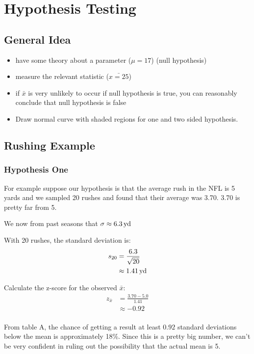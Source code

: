 \documentclass[letterpaper, landscape]{exam}
\begin{document}
  \section{Hypothesis Testing}

  \subsection{General Idea}
  \begin{itemize}
    \item have some theory about a parameter ($\mu = 17$) (null hypothesis)
    \item measure the relevant statistic ($\bar{x = 25}$)
    \item if $\bar{x}$ is very unlikely to occur if null hypothesis is true, you
      can reasonably conclude that null hypothesis is false
    \item Draw normal curve with shaded regions for one and two sided
      hypothesis.
  \end{itemize}

  \subsection{Rushing Example}

  \subsubsection{Hypothesis One}
  For example suppose our hypothesis is that the average rush in the NFL is 5
  yards and we sampled 20 rushes and found that their average was 3.70. 3.70 is
  pretty far from 5.

  We now from past seasons that $\sigma \approx \unit[6.3]{yd}$

  With 20 rushes, the standard deviation is:
  \begin{align*}
    s_{20} & = \frac{6.3}{\sqrt{20}} \\
           & \approx \unit[1.41]{yd} \\
  \end{align*}

  Calculate the z-score for the observed $\bar{x}$:
  \begin{align*}
    z_{\bar{x}} & = \frac{3.70 - 5.0}{1.41} \\
                & \approx -0.92 \\
  \end{align*}

  From table A, the chance of getting a result at least $0.92$ standard
  deviations below the mean is approximately 18\%. Since this is a pretty big
  number, we can't be very confident in ruling out the possibility that the
  actual mean is 5.
\end{document}
